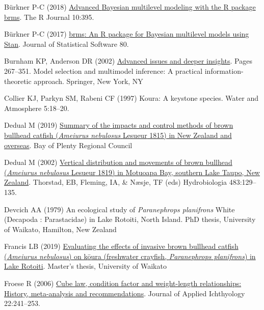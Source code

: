 \documentclass[
  letterpaper,
  DIV=11,
  numbers=noendperiod]{scrartcl}
\newlength{\cslhangindent}
\newenvironment{CSLReferences}[2] %
 {\begin{list}{}{%
  \setlength{\itemindent}{0pt}
  \setlength{\leftmargin}{0pt}
  \setlength{\parsep}{0pt}
  \ifodd #1
   \setlength{\leftmargin}{\cslhangindent}
   \setlength{\itemindent}{-1\cslhangindent}
  \fi
  \setlength{\itemsep}{#2\baselineskip}}}
 {\end{list}}
\begin{document}
\begin{CSLReferences}{1}{1}
Bürkner P-C (2018) \href{https://doi.org/10.32614/rj-2018-017}{Advanced
{B}ayesian multilevel modeling with the {R} package brms}. The R Journal
10:395.

Bürkner P-C (2017) \href{https://doi.org/10.18637/jss.v080.i01}{{brms}:
An {R} package for {B}ayesian multilevel models using {Stan}}. Journal
of Statistical Software 80.

Burnham KP, Anderson DR (2002)
\href{https://doi.org/10.1007/978-0-387-22456-5_6}{Advanced issues and
deeper insights}. Pages 267--351. Model selection and multimodel
inference: A practical information-theoretic approach. Springer, New
York, NY

Collier KJ, Parkyn SM, Rabeni CF (1997) Koura: A keystone species. Water
and Atmosphere 5:18--20.

Dedual M (2019)
\href{https://atlas.boprc.govt.nz/api/v1/edms/document/A3591759/content}{Summary
of the impacts and control methods of brown bullhead catfish
({\emph{Ameiurus nebulosus}} {Lesueur} 1815) in {New Zealand} and
overseas}. Bay of Plenty Regional Council

Dedual M (2002)
\href{https://doi.org/10.1007/978-94-017-0771-8_15}{Vertical
distribution and movements of brown bullhead ({\emph{Ameiurus
nebulosus}} {Lesueur} 1819) in {Motuoapa Bay}, southern {Lake Taupo},
{New Zealand}}. Thorstad, EB, Fleming, IA, \& Næsje, TF (eds)
Hydrobiologia 483:129--135.

Devcich AA (1979) An ecological study of {\emph{Paranephrops
planifrons}} {White} ({Decapoda} : {Parastacidae}) in {Lake Rotoiti},
{North Island}. PhD thesis, University of Waikato, Hamilton, New Zealand

Francis LB (2019)
\href{https://researchcommons.waikato.ac.nz/handle/10289/12746}{Evaluating
the effects of invasive brown bullhead catfish ({\emph{Ameiurus
nebulosus}}) on k{ō}ura (freshwater crayfish, {\emph{Paranephrops
planifrons}}) in {Lake Rotoiti}}. Master's thesis, University of Waikato

Froese R (2006)
\href{https://doi.org/10.1111/j.1439-0426.2006.00805.x}{Cube law,
condition factor and weight-length relationships: History, meta-analysis
and recommendations}. Journal of Applied Ichthyology 22:241--253.


\end{CSLReferences}
\end{document}
